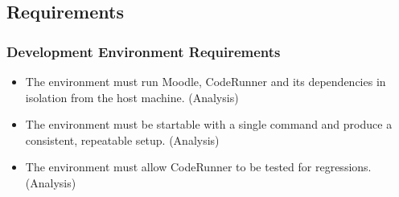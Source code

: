 \subsection{Requirements}
%
%
%
%
%
%
%
%
%
%
%
%
\subsubsection{Development Environment Requirements}
\begin{itemize}
    \item[\textbf{DE1}] The environment must run Moodle, CodeRunner and its dependencies in isolation from the host machine. (Analysis)
    \item[\textbf{DE2}] The environment must be startable with a single command and produce a consistent, repeatable setup. (Analysis)
    \item[\textbf{DE3}] The environment must allow CodeRunner to be tested for regressions. (Analysis)
\end{itemize}

